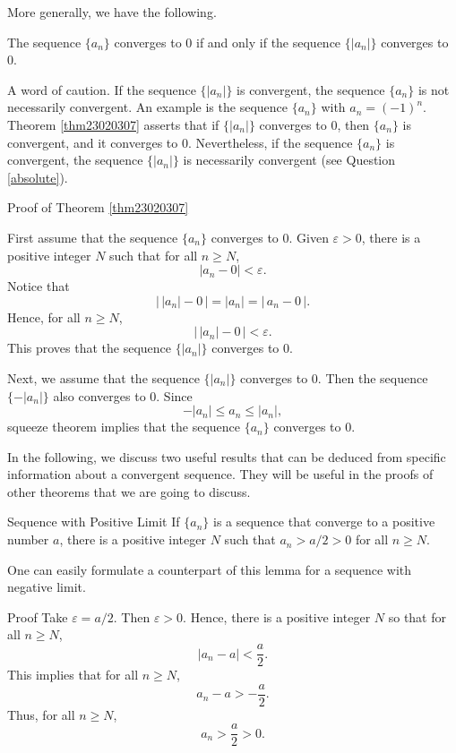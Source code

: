 More generally, we have the following.
\begin{theorem}[label=thm23020307]{}
The sequence $\{a_n\}$ converges to 0 if and only if the sequence $\{|a_n|\}$ converges to 0.
\end{theorem}
 
A word of caution. If the sequence $\{|a_n|\}$ is convergent, the sequence $\{a_n\}$ is not necessarily convergent. An example is the sequence $\{a_n\}$ with $a_n=(-1)^n$. 
Theorem \ref{thm23020307} asserts that if $\{|a_n|\}$ converges to $0$, then $\{a_n\}$ is convergent, and it converges to 0.
Nevertheless, if the sequence $\{a_n\}$ is convergent, the sequence $\{|a_n|\}$ is necessarily convergent (see Question \ref{absolute}).
 
\begin{myproof}{\linkt Proof of Theorem \ref{thm23020307}\linko }
 
First assume that the sequence $\{a_n\}$ converges to 0. Given $\varepsilon>0$, there is a positive integer $N$ such that for all $n\geq N$,
\[|a_n-0|<\varepsilon.\]\bp
Notice that \[\bigl|\,|a_n|-0\,\bigr|=|a_n|=|\,a_n-0\,|.\]
  Hence, for all $n\geq N$,
\[\bigl|\,|a_n|-0\,\bigr|<\varepsilon.\]This proves that the sequence $\{|a_n|\}$ converges to 0.

Next, we assume that the sequence $\{|a_n|\}$ converges to 0. Then the sequence $\{-|a_n|\}$ also converges to 0. Since
\[-|a_n|\leq a_n\leq |a_n|,\]
 squeeze theorem implies that the sequence $\{a_n\}$ converges to 0.
\end{myproof}
 
In the following, we discuss two useful results that can be deduced from specific information about a convergent sequence. They will be useful in the proofs of other theorems that we are going to discuss.

\begin{lemma}[label=23020405]{Sequence with Positive Limit}
If $\{a_n\}$ is a sequence that converge to a positive number $a$, there is a positive integer $N$ such that $a_n>a/2>0$ for all $n\geq N$. 
\end{lemma}
One can easily formulate a counterpart of this lemma for a sequence with negative limit.
\begin{myproof}{Proof}
Take $\varepsilon=a/2$. Then $\varepsilon>0$. Hence, there is a positive integer $N$ so that for all $n\geq N$, 
\[|a_n-a|<\frac{a}{2}.\]
This implies that for all $n\geq N$,
\[a_n-a>-\frac{a}{2}.\]
Thus, for all $n\geq N$,
\[a_n>\frac{a}{2}>0.\]
\end{myproof}

